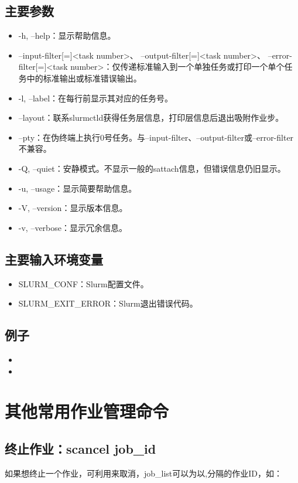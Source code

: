 \subsection{主要参数}
\begin{itemize}
      \item -h, --help：显示帮助信息。
      \item --input-filter[=]<task number>、 --output-filter[=]<task number>、 --error-filter[=]<task number>：仅传递标准输入到一个单独任务或打印一个单个任务中的标准输出或标准错误输出。
      \item -l, --label：在每行前显示其对应的任务号。
      \item --layout：联系slurmctld获得任务层信息，打印层信息后退出吸附作业步。
      \item --pty：在伪终端上执行0号任务。与--input-filter、--output-filter或--error-filter不兼容。
      \item -Q, --quiet：安静模式。不显示一般的sattach信息，但错误信息仍旧显示。
      \item -u, --usage：显示简要帮助信息。
      \item -V, --version：显示版本信息。
      \item -v, --verbose：显示冗余信息。
\end{itemize}

\subsection{主要输入环境变量}
\begin{itemize}
	\item SLURM\_CONF：Slurm配置文件。
    \item SLURM\_EXIT\_ERROR：Slurm退出错误代码。
\end{itemize}

\subsection{例子}
\begin{itemize}
	\item {}
    \item {}
\end{itemize}

\section{其他常用作业管理命令}
\subsection{终止作业：scancel job\_id}
如果想终止一个作业，可利用来取消，job\_list可以为以,分隔的作业ID，如：

